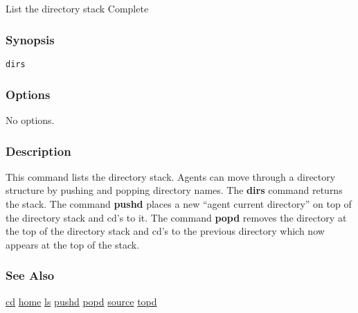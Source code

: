 \subsection{}
\label{dirs}
List the directory stack 
 Complete
\subsubsection*{Synopsis}
\begin{verbatim}
dirs
\end{verbatim}
\subsubsection*{Options}
 No options. 
\subsubsection*{Description}
 This command lists the directory stack. Agents can move through a directory structure by pushing and popping directory names. The \textbf{dirs}
 command returns the stack. 
 The command \textbf{pushd}
 places a new ``agent current directory'' on top of the directory stack and cd's to it. The command \textbf{popd}
 removes the directory at the top of the directory stack and cd's to the previous directory which now appears at the top of the stack. 
\subsubsection*{See Also}
\hyperref[cd]{cd} \hyperref[home]{home} \hyperref[ls]{ls} \hyperref[pushd]{pushd} \hyperref[popd]{popd} \hyperref[source]{source} \hyperref[topd]{topd} 
